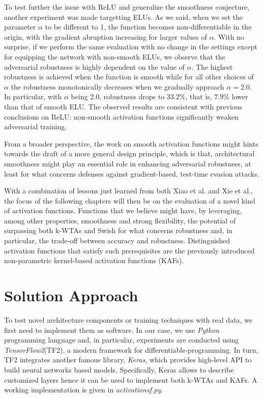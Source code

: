 \documentclass[LaM,binding=0.6cm]{./packages/sapthesis/sapthesis}
\begin{document}
    To test further the issue with ReLU and generalize the smoothness conjecture, another 
    experiment was made targetting ELUs. As we said, when we set the parameter $\alpha$ to be different to 
    1, the function becomes non-differentiable in the origin, with the gradient
    abruption increasing for larger values of $\alpha$. With no surprise, if we perform the same evaluation with no change in the settings
    except for equipping the network with non-smooth ELUs,
    we observe that the adversarial robustness is highly dependent on the value of $\alpha$. 
    The highest robustness is achieved when the function is smooth while for all other choices of 
    $\alpha$ the robustness monotonically decreases when we gradually approach $\alpha = 2.0$. 
    In particular, with $\alpha$ being $2.0$, robustness drops to $33.2\%$, that is, $7.9\%$ lower than that of smooth ELU. 
    The observed results are consistent with previous conclusions on ReLU: non-smooth activation functions significantly
    weaken adversarial training.

    From a broader perspective, the work on smooth activation functions might
    hints towards the draft of a more general design principle, which is that,
    architectural smoothness might play an essential role in enhancing 
    adversarial robustness, at least for what concerns defenses against 
    gradient-based, test-time evasion attacks.

    With a combination of lessons just learned from both Xiao et al. and
    Xie et al., the focus of the following chapters will then be on the evaluation
    of a novel kind of activation functions. Functions that we believe might have, 
    by leveraging, among other properties, smoothness
    and strong flexibility, the potential of surpassing both k-WTAs and Swish 
    for what concerns robustness and, in particular, the trade-off
    between accuracy and robustness. Distinguished activation functions that 
    satisfy such prerequisites are the previously introduced non-parametric 
    kernel-based activation functions (KAFs). 



\chapter{Solution Approach}

    \label{chap:6}
    To test novel architecture components or training techniques with real data, we first need to implement them as software. In our case, 
    we use \textit{Python} \cite{python} programming language and, in particular, experiments are conducted using \textit{TensorFlow2}(TF2)\cite{tf2}, a modern 
    framework for differentiable-programming. In turn, TF2 integrates another famous library, \textit{Keras}, which provides high-level 
    API to build neural networks based models. Specifically, Keras allows to describe customized layers hence it can be used to implement both k-WTAs and KAFs.
    A working implementation is given in \textit{activationsf.py}.
\end{document}
